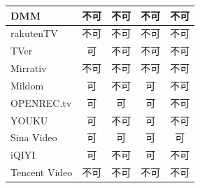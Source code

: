 \begin{table}[htbp]
\begin{center}
\begin{tabular}{|l|c|c|c|c|}
      DMM  & 不可 & 不可 & 不可 & 不可 \\ \hline
      rakutenTV & 不可 & 不可 & 不可 & 不可 \\ \hline
      TVer  & 可 & 不可 & 不可 & 不可 \\ \hline
      Mirrativ & 不可 & 不可 & 不可 & 不可 \\ \hline
      Mildom  & 可 & 不可 & 可 & 不可 \\ \hline
      OPENREC.tv & 可 & 可 & 可 & 不可 \\ \hline
      YOUKU & 可 & 不可 & 可 & 不可 \\ \hline
      Sina Video & 可 & 可 & 可 & 可 \\ \hline
      iQIYI  & 可 & 不可 & 可 & 不可 \\ \hline
      Tencent Video & 不可 & 不可 & 不可 & 不可 \\ \hline
    \end{tabular}
  \end{center}
\end{table}
